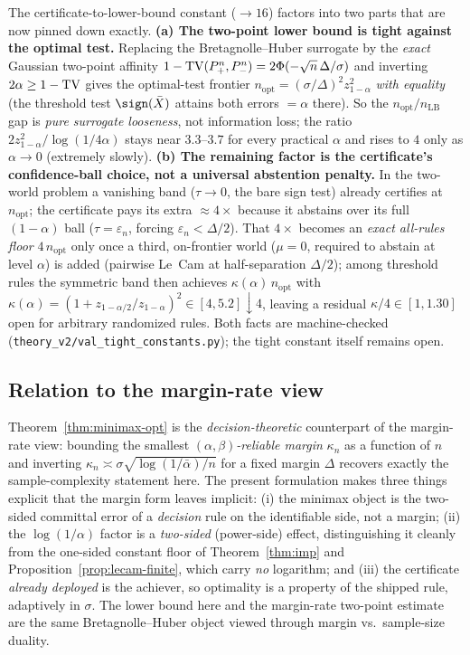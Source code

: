 \begin{remark}\label{rmk:opt-decomp}
The certificate-to-lower-bound constant ($\to16$) factors into two parts that are now pinned down
exactly. \textbf{(a) The two-point lower bound is tight against the optimal test.} Replacing the
Bretagnolle--Huber surrogate by the \emph{exact} Gaussian two-point affinity
$1-\mathrm{TV}(P^n_+,P^n_-)=2\Phi(-\sqrt n\,\Delta/\sigma)$ and inverting $2\alpha\ge1-\mathrm{TV}$ gives the
optimal-test frontier $n_{\mathrm{opt}}=(\sigma/\Delta)^2 z_{1-\alpha}^2$ \emph{with equality}
(the threshold test $\sign(\bar X)$ attains both errors $=\alpha$ there). So the
$n_{\mathrm{opt}}/n_{\mathrm{LB}}$ gap is \emph{pure surrogate looseness}, not information loss;
the ratio $2z_{1-\alpha}^2/\log(1/4\alpha)$ stays near $3.3$--$3.7$ for every practical $\alpha$
and rises to $4$ only as $\alpha\to0$ (extremely slowly). \textbf{(b) The remaining factor is the
certificate's confidence-ball choice, not a universal abstention penalty.} In the two-world
problem a vanishing band ($\tau\to0$, the bare sign test) already certifies at $n_{\mathrm{opt}}$;
the certificate pays its extra $\approx4\times$ because it abstains over its full $(1-\alpha)$ ball
($\tau=\varepsilon_n$, forcing $\varepsilon_n<\Delta/2$). That $4\times$ becomes an \emph{exact
all-rules floor} $4\,n_{\mathrm{opt}}$ only once a third, on-frontier world ($\mu=0$, required to
abstain at level $\alpha$) is added (pairwise Le~Cam at half-separation $\Delta/2$); among
threshold rules the symmetric band then achieves $\kappa(\alpha)\,n_{\mathrm{opt}}$ with
$\kappa(\alpha)=(1+z_{1-\alpha/2}/z_{1-\alpha})^2\in[4,5.2]\downarrow4$, leaving a residual
$\kappa/4\in[1,1.30]$ open for arbitrary randomized rules. Both facts are machine-checked
(\texttt{theory\_v2/val\_tight\_constants.py}); the tight constant itself remains open.
\end{remark}

\subsection{Relation to the margin-rate view}

Theorem~\ref{thm:minimax-opt} is the \emph{decision-theoretic} counterpart of the margin-rate
view: bounding the smallest \emph{$(\alpha,\beta)$-reliable margin} $\kappa_n$ as a function of
$n$ and inverting $\kappa_n\asymp\sigma\sqrt{\log(1/\bar\alpha)/n}$ for a fixed margin $\Delta$
recovers exactly the sample-complexity statement here. The present formulation makes three things
explicit that the margin form leaves implicit: (i) the minimax object is the two-sided committal
error of a \emph{decision} rule on the identifiable side, not a margin; (ii) the $\log(1/\alpha)$
factor is a \emph{two-sided} (power-side) effect, distinguishing it cleanly from the one-sided
constant floor of Theorem~\ref{thm:imp} and Proposition~\ref{prop:lecam-finite}, which carry
\emph{no} logarithm; and (iii) the certificate \emph{already deployed} is the achiever, so
optimality is a property of the shipped rule, adaptively in $\sigma$. The lower bound here and the
margin-rate two-point estimate are the same Bretagnolle--Huber object viewed through margin vs.\
sample-size duality.

